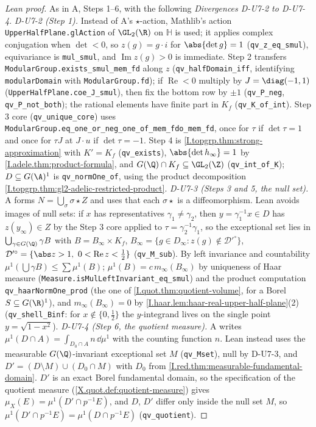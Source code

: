 \begin{proof}[Lean proof]
As in A, Steps 1--6, with the following \emph{Divergences D-U7-2 to D-U7-4}. \emph{D-U7-2 (Step 1).} Instead of A's $\star$-action, Mathlib's action \texttt{UpperHalfPlane.glAction} of $\GL_2(\R)$ on $\mathbb H$ is used; it applies complex conjugation when $\det<0$, so $z(g)=g\cdot i$ for $\abs{\det g}=1$ (\texttt{qv\_z\_eq\_smul}), equivariance is \texttt{mul\_smul}, and $\operatorname{Im}z(g)>0$ is immediate. Step 2 transfers \texttt{ModularGroup.exists\_smul\_mem\_fd} along $z$ (\texttt{qv\_halfDomain\_iff}, identifying \texttt{modularDomain} with \texttt{ModularGroup.fd}); if $\operatorname{Re}<0$ multiply by $J=\diag(-1,1)$ (\texttt{UpperHalfPlane.coe\_J\_smul}), then fix the bottom row by $\pm1$ (\texttt{qv\_P\_neg}, \texttt{qv\_P\_not\_both}); the rational elements have finite part in $K_f$ (\texttt{qv\_K\_of\_int}). Step 3 core (\texttt{qv\_unique\_core}) uses \texttt{ModularGroup.eq\_one\_or\_neg\_one\_of\_mem\_fdo\_mem\_fd}, once for $\tau$ if $\det\tau=1$ and once for $\tau J$ at $J\cdot u$ if $\det\tau=-1$. Step 4 is \cref{I.topgrp.thm:strong-approximation} with $K'=K_f$ (\texttt{qv\_exists}), $\abs{\det h_\infty}=1$ by \cref{I.adele.thm:product-formula}, and $G(\Q)\cap K_f\subseteq\GL_2(\Z)$ (\texttt{qv\_int\_of\_K}); $D\subseteq G(\A)^1$ is \texttt{qv\_normOne\_of}, using the product decomposition \cref{I.topgrp.thm:gl2-adelic-restricted-product}. \emph{D-U7-3 (Steps 3 and 5, the null set).} A forms $N=\bigcup_\sigma\sigma\star Z$ and uses that each $\sigma\star$ is a diffeomorphism. Lean avoids images of null sets: if $x$ has representatives $\gamma_1\neq\gamma_2$, then $y=\gamma_1^{-1}x\in D$ has $z(y_\infty)\in Z$ by the Step 3 core applied to $\tau=\gamma_2^{-1}\gamma_1$, so the exceptional set lies in $\bigcup_{\gamma\in G(\Q)}\gamma B$ with $B=B_\infty\times K_f$, $B_\infty=\{g\in D_\infty:z(g)\notin\mathcal D'^\circ\}$, $\mathcal D'^\circ=\{\abs z>1,\ 0<\operatorname{Re}z<\frac12\}$ (\texttt{qv\_M\_sub}). By left invariance and countability $\mu^1(\bigcup\gamma B)\le\sum\mu^1(B)$; $\mu^1(B)=c\,m_\infty(B_\infty)$ by uniqueness of Haar measure (\texttt{Measure.isMulLeftInvariant\_eq\_smul}) and the product computation \texttt{qv\_haarNormOne\_prod} (the one of \cref{I.quot.thm:quotient-volume}, for a Borel $S\subseteq G(\R)^1$), and $m_\infty(B_\infty)=0$ by \cref{I.haar.lem:haar-real-upper-half-plane}(2) (\texttt{qv\_shell\_Binf}: for $x\notin\{0,\frac12\}$ the $y$-integrand lives on the single point $y=\sqrt{1-x^2}$). \emph{D-U7-4 (Step 6, the quotient measure).} A writes $\mu^1(D\cap A)=\int_{D_0\cap A}n\,\dd\mu^1$ with the counting function $n$. Lean instead uses the measurable $G(\Q)$-invariant exceptional set $M$ (\texttt{qv\_Mset}), null by D-U7-3, and $D'=(D\setminus M)\cup(D_0\cap M)$ with $D_0$ from \cref{I.red.thm:measurable-fundamental-domain}. $D'$ is an exact Borel fundamental domain, so the specification of the quotient measure (\cref{X.quot.def:quotient-measure}) gives $\mu_X(E)=\mu^1(D'\cap p^{-1}E)$, and $D$, $D'$ differ only inside the null set $M$, so $\mu^1(D'\cap p^{-1}E)=\mu^1(D\cap p^{-1}E)$ (\texttt{qv\_quotient}).
\end{proof}

